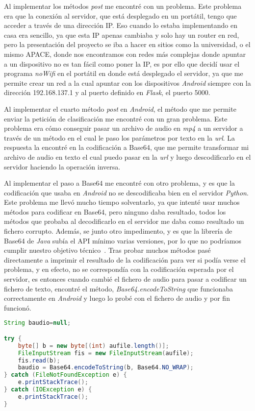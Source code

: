 Al implementar los métodos \textit{post} me encontré con un problema. Este problema era que la conexión al servidor, que está desplegado en un portátil, tengo que acceder a través de una dirección IP. Eso cuando lo estaba implementando en casa era sencillo, ya que esta IP apenas cambiaba y solo hay un router en red, pero la presentación del proyecto se iba a hacer en sitios como la universidad, o el mismo APACE, donde nos encontramos con redes más complejas donde apuntar a un dispositivo no es tan fácil como poner la IP, es por ello que decidí usar el programa \textit{noWifi} en el portátil en donde está desplegado el servidor, ya que me permite crear un red a la cual apuntar con los dispositivos \textit{Android} siempre con la dirección 192.168.137.1 y al puerto definido en \textit{Flask}, el puerto 5000.

Al implementar el cuarto método \textit{post} en \textit{Android}, el método que me permite enviar la petición de clasificación me encontré con un gran problema. Este problema era cómo conseguir pasar un archivo de audio en \textit{mp4} a un servidor a través de un método en el cual le paso los parámetros por texto en la \textit{url}. La respuesta la encontré en la codificación a Base64, que me permite transformar mi archivo de audio en texto el cual puedo pasar en la \textit{url} y luego descodificarlo en el servidor haciendo la operación inversa. 

Al implementar el paso a Base64 me encontré con otro problema, y es que la codificación que usaba en \textit{Android} no se descodificaba bien en el servidor \textit{Python}. Este problema me llevó mucho tiempo solventarlo, ya que intenté usar muchos métodos para codificar en Base64, pero ninguno daba resultado, todos los métodos que probaba al decodificarlo en el servidor me daba como resultado un fichero corrupto. Además, se junto otro impedimento, y es que la librería de Base64 de \textit{Java} subía el API mínimo varias versiones, por lo que no podríamos cumplir nuestro objetivo técnico~\cite{base64java}. Tras probar muchos métodos pasé directamente a imprimir el resultado de la codificación para ver si podía verse el problema, y en efecto, no se correspondía con la codificación esperada por el servidor, es entonces cuando cambié el fichero de audio para pasar a codificar un fichero de texto, encontré el método, \textit{Base64.encodeToString} que funcionaba correctamente en \textit{Android} y luego lo probé con el fichero de audio y por fin funcionó.

\begin{lstlisting}[language={Java}]
String baudio=null;

try {
	byte[] b = new byte[(int) aufile.length()];
	FileInputStream fis = new FileInputStream(aufile);
	fis.read(b);
	baudio = Base64.encodeToString(b, Base64.NO_WRAP);
} catch (FileNotFoundException e) {
	e.printStackTrace();
} catch (IOException e) {
	e.printStackTrace();
}	
\end{lstlisting}

